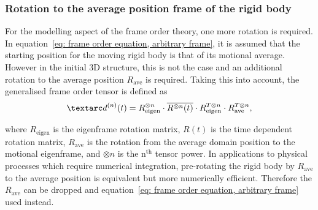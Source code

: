 
\subsubsection{Rotation to the average position frame of the rigid body}

For the modelling aspect of the frame order theory, one more rotation is required.
In equation~\ref{eq: frame order equation, arbitrary frame}, it is assumed that the starting position for the moving rigid body is that of its motional average.
However in the initial 3D structure, this is not the case and an additional rotation to the average position $R_\textrm{ave}$ is required.
Taking this into account, the generalised frame order tensor is defined as
\begin{equation}    %
    \FOn(t) = R_\textrm{eigen}^{\otimes n} \cdot \overline{R^{\otimes n}(t)} \cdot R_\textrm{eigen}^{T \otimes n} \cdot R_\textrm{ave}^{T \otimes n} ,
\end{equation}

where $R_\textrm{eigen}$ is the eigenframe rotation matrix, $R(t)$ is the time dependent rotation matrix, $R_\textrm{ave}$ is the rotation from the average domain position to the motional eigenframe, and $\otimes n$ is the n$^\textrm{th}$ tensor power.
In applications to physical processes which require numerical integration, pre-rotating the rigid body by $R_\textrm{ave}$ to the average position is equivalent but more numerically efficient.
Therefore the $R_\textrm{ave}$ can be dropped and equation~\ref{eq: frame order equation, arbitrary frame} used instead.

%
%
%




